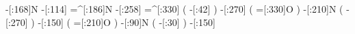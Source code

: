      -[:168]N%
     -[:114]%
    =^[:186]N%
     -[:258]%
    =^[:330]%
               (
          -[:42]\phantom{N}%
               )
     -[:270]%
               (
         =[:330]O%
               )
     -[:210]N%
               (
         -[:270]%
               )
     -[:150]%
               (
         =[:210]O%
               )
      -[:90]N%
               (
          -[:30]%
               )
     -[:150]%